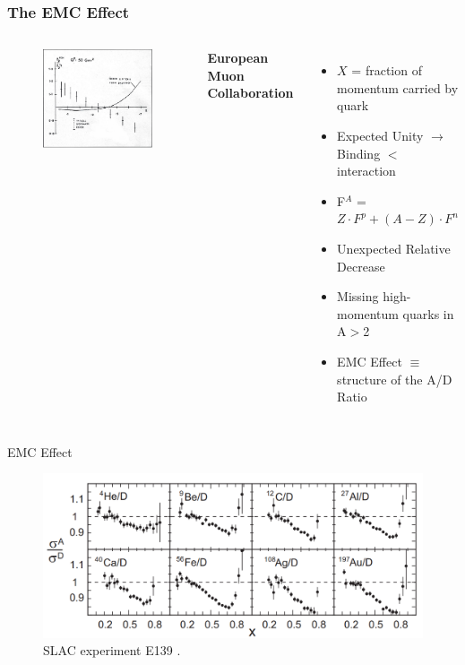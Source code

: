 \documentclass[12pt]{beamer}
\begin{document}
\begin{frame}
\frametitle{The EMC Effect}
\begin{columns}[t]
	\vspace{-35pt}
	\begin{figure}
		\includegraphics[width =7cm]{../images/Thesis/EMC.png}
		\caption*{\cite{cc}}
	\end{figure}
	\centering
	\textbf{ European Muon Collaboration}
	\begin{itemize}
		\item \small$X$ = fraction of momentum carried by quark	
		\item Expected Unity $\rightarrow$ Binding $<$ interaction
		\item F$^A$ = $Z \cdot F^p + (A-Z)\cdot F^n$  
		\item Unexpected Relative Decrease
		\item Missing high-momentum quarks in A$>$2
		\item EMC Effect $\equiv$ structure of the A/D Ratio
	\end{itemize}
	
\end{columns}
\end{frame}



\begin{frame}{EMC Effect}

\begin{figure}
\caption*{\label{EMC_slac} SLAC experiment E139 \cite{slac_emc} .}
\includegraphics[width =12cm]{../images/EMC_slac_horiz.png}
\end{figure}


\end{frame}
\end{document}
